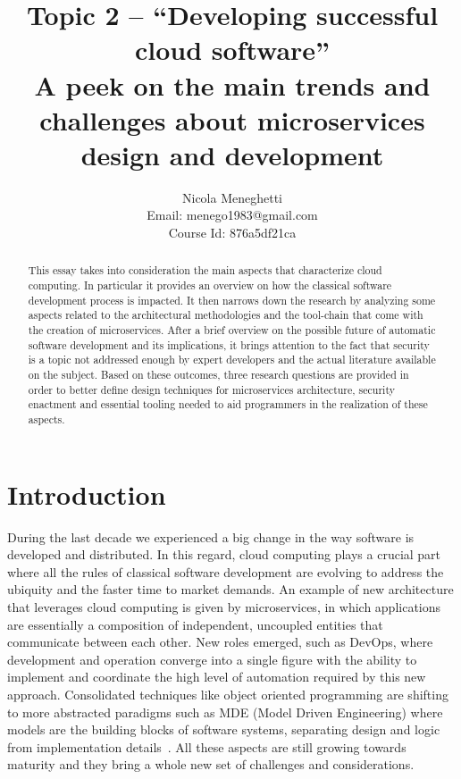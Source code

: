 \documentclass[a4paper, 10pt, conference]{ieeeconf}
\title{Topic 2 -- ``Developing successful cloud software'' \\
\large{A peek on the main trends and challenges about microservices design and development}} %
\author{Nicola Meneghetti \\
	Email: menego1983@gmail.com \\ 
	Course Id: 876a5df21ca
}
\begin{document}
\maketitle
\thispagestyle{empty}
\pagestyle{empty}

\begin{abstract}

This essay takes into consideration the main aspects that characterize cloud computing. In particular it provides an overview on how the classical software development process is impacted. It then narrows down the research by analyzing some aspects related to the architectural methodologies and the tool-chain that come with the creation of microservices. After a brief overview on the possible future of automatic software development and its implications, it brings attention to the fact that security is a topic not addressed enough by expert developers and the actual literature available on the subject. Based on these outcomes, three research questions are provided in order to better define design techniques for microservices architecture, security  enactment and  essential tooling needed to aid programmers in the realization of these aspects.

\end{abstract}

\section{Introduction}

During the last decade we experienced a big change in the way software is developed and distributed. In this regard, cloud computing plays a crucial part where all the rules of classical software development are evolving to address the ubiquity and the faster time to market demands. An example of new architecture that leverages cloud computing is given by microservices, in which applications are essentially a composition of independent, uncoupled entities that communicate between each other\cite{s-newman}. New roles emerged, such as DevOps, where development and operation converge into a single figure with the ability to implement and coordinate the high level of automation required by this new approach. Consolidated techniques like object oriented programming are shifting to more abstracted paradigms such as MDE (Model Driven Engineering) where models are the building blocks of software systems, separating design and logic from implementation details~\cite{overview-platforms, fuggetta2014software}. All these aspects are still growing towards maturity and they bring a whole new set of challenges and considerations.
\end{document}
